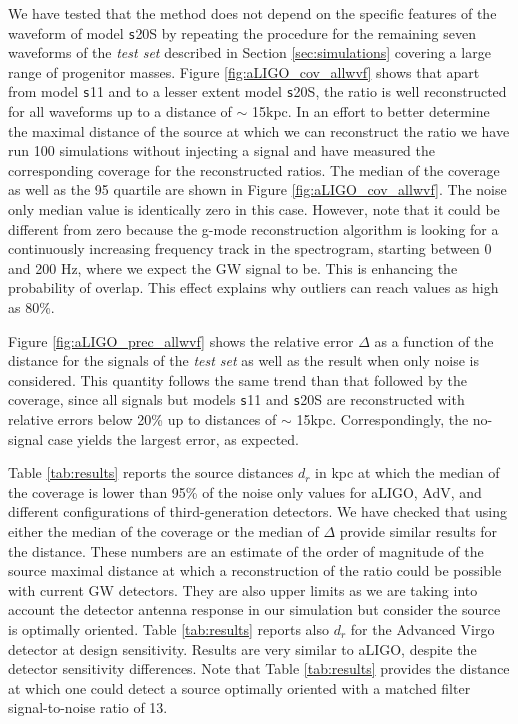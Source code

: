 We have tested that the method does not depend on the specific features of the waveform of model {\texttt s20S} by repeating the procedure for the remaining seven waveforms of the {\it test set} described in Section \ref{sec:simulations} covering
a large range of progenitor masses. Figure \ref{fig:aLIGO_cov_allwvf} shows that apart from model {\texttt s11} and to a lesser extent model {\texttt s20S}, the ratio is well reconstructed for all waveforms up to a distance of $\sim$ 15kpc. In an
effort to better determine the maximal distance of the source at which we can reconstruct the ratio we have run 100 simulations without injecting a signal and have measured the corresponding coverage for the reconstructed ratios.
The median of the coverage as well as the 95 quartile are shown in Figure \ref{fig:aLIGO_cov_allwvf}. 
The noise only median value is identically zero in this case. However, note that it could be different from zero because
the g-mode reconstruction algorithm is looking for a continuously  increasing frequency track
in the spectrogram, starting between 0 and 200 Hz, where we expect the GW signal to be.
This is enhancing the probability of overlap. This effect explains why outliers can reach
values as high as 80\%. 

Figure \ref{fig:aLIGO_prec_allwvf} shows the relative error $\Delta$ as a function of the distance for the signals of the {\it test set}
as well as the result when only noise is considered. This quantity follows the same trend than that followed by the coverage, since all signals but models {\texttt s11} and {\texttt s20S} are reconstructed with relative errors below 20\% up to distances of $\sim$ 15kpc. Correspondingly, the no-signal case yields the largest error, as expected.

Table \ref{tab:results} reports the source distances $d_r$ in kpc at which the median of the coverage is lower than 95\% of the noise only values for aLIGO, AdV, and different configurations of third-generation detectors. We have checked that using either the median of the coverage or the median of $\Delta$ provide similar results for the distance.
These numbers are an estimate of the order of magnitude of the source maximal distance at which a
reconstruction of the ratio could be possible with current GW detectors.
They are also upper limits as we are taking into account the detector antenna response in our
simulation but consider the source is optimally oriented. 
Table \ref{tab:results} reports also $d_r$ for the Advanced Virgo detector at design sensitivity.
Results are very similar to aLIGO, despite the detector sensitivity differences.
Note that Table \ref{tab:results} provides the distance at which one could detect a source
optimally oriented with a matched filter signal-to-noise ratio of 13.



